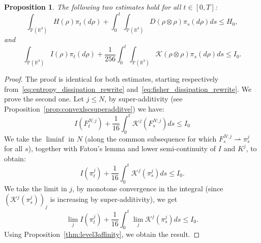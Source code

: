 \documentclass[11pt,a4paper]{article}
\theoremstyle{definition}
\theoremstyle{plain}
\newtheorem{prop}[defi]{Proposition}
\begin{document}
\begin{prop}
    \label{prop:level3estimates}
     The following two estimates hold for all $t\in[0,T]$:
    \begin{equation}
    \label{eq:entropydissipation_pi}
    \int_{\mathbb{P}(\mathbb{R}^3)} H(\rho) \pi_t(d\rho) + \int_0^t \int_{\mathbb{P}(\mathbb{R}^3)}D(\rho \otimes \rho) \pi_s(d\rho) ds \leq H_0,
    \end{equation}
    and
    \begin{equation}
    \label{eq:fisherdissipation_pi}
    \int_{\mathbb{P}(\mathbb{R}^3)} I(\rho) \pi_t(d\rho) + \frac{1}{256} \int_0^t \int_{\mathbb{P}(\mathbb{R}^3)}\mathcal{K}(\rho \otimes \rho) \pi_s(d\rho) ds \leq I_0.
    \end{equation}
\end{prop}

\begin{proof}
    The proof is identical for both estimates, starting respectively from~\eqref{eq:entropy_dissipation_rewrite} and~\eqref{eq:fisher_dissipation_rewrite}. We prove the second one.
    Let $j\leq N$, by super-additivity (see Proposition~\ref{prop:convexlscsuperadditve}) we have:
    $$I(F^{N:j}_t)+\frac{1}{16}\int_0^t \mathcal{K}^j(F^{N:j}_s)ds \leq I_0$$
    We take the $\liminf$ in $N$ (along the common subsequence for which $F^{N:j}_s\rightharpoonup \pi^j_s$ for all $s$), together with Fatou's lemma and lower semi-continuity of $I$ and $K^j$, to obtain:
    $$I(\pi^{j}_t)+\frac{1}{16}\int_0^t \mathcal{K}^j(\pi^{j}_s)ds \leq I_0.$$
    We take the limit in $j$, by monotone convergence in the integral (since $(\mathcal{K}^j(\pi^{j}_s))_j$ is increasing by super-additivity), we get
    $$\lim_jI(\pi^{j}_t)+\frac{1}{16}\int_0^t \lim_j \mathcal{K}^j(\pi^{j}_s)ds \leq I_0.$$
    Using Proposition~\ref{thm:level3affinity}, we obtain the result.    
\end{proof}
\end{document}
